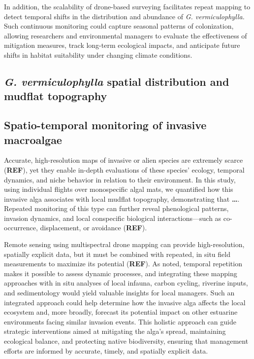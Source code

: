 \documentclass[
  letterpaper,
  DIV=11,
  numbers=noendperiod]{scrartcl}
\begin{document}
In addition, the scalability of drone-based surveying facilitates repeat
mapping to detect temporal shifts in the distribution and abundance of
\emph{G. vermiculophylla.} Such continuous monitoring could capture
seasonal patterns of colonization, allowing researchers and
environmental managers to evaluate the effectiveness of mitigation
measures, track long-term ecological impacts, and anticipate future
shifts in habitat suitability under changing climate conditions.

\subsection{\texorpdfstring{\emph{G. vermiculophylla} spatial
distribution and mudflat
topography}{G. vermiculophylla spatial distribution and mudflat topography}}\label{g.-vermiculophylla-spatial-distribution-and-mudflat-topography}

\subsection{Spatio-temporal monitoring of invasive
macroalgae}\label{spatio-temporal-monitoring-of-invasive-macroalgae}

Accurate, high-resolution maps of invasive or alien species are
extremely scarce (\textbf{REF}), yet they enable in-depth evaluations of
these species' ecology, temporal dynamics, and niche behavior in
relation to their environment. In this study, using individual flights
over monospecific algal mats, we quantified how this invasive alga
associates with local mudflat topography, demonstrating that
\textbf{\ldots{}}. Repeated monitoring of this type can further reveal
phenological patterns, invasion dynamics, and local conspecific
biological interactions---such as co-occurrence, displacement, or
avoidance (\textbf{REF}).

Remote sensing using multispectral drone mapping can provide
high-resolution, spatially explicit data, but it must be combined with
repeated, in situ field measurements to maximize its potential
(\textbf{REF}). As noted, temporal repetition makes it possible to
assess dynamic processes, and integrating these mapping approaches with
in situ analyses of local infauna, carbon cycling, riverine inputs, and
sedimentology would yield valuable insights for local managers. Such an
integrated approach could help determine how the invasive alga affects
the local ecosystem and, more broadly, forecast its potential impact on
other estuarine environments facing similar invasion events. This
holistic approach can guide strategic interventions aimed at mitigating
the alga's spread, maintaining ecological balance, and protecting native
biodiversity, ensuring that management efforts are informed by accurate,
timely, and spatially explicit data.
\end{document}
